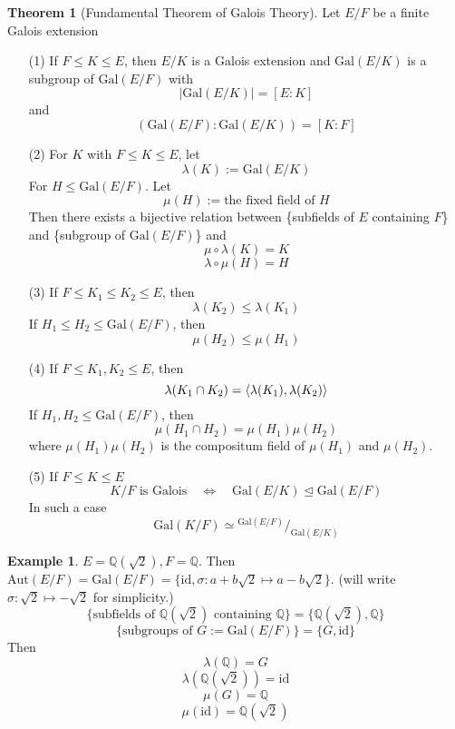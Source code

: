 \documentclass{article}
\theoremstyle{definition}
\newtheorem{thm}{Theorem}
\newtheorem{ex}{Example}
\newcommand*\quot[2]{{^{\textstyle #1}\big/_{\textstyle #2}}}
\newcommand{\QQ}{\mathbb Q}
\newcommand{\Lra}{\Leftrightarrow}
\begin{document}
\begin{thm}[Fundamental Theorem of Galois Theory]
	Let $E/F$ be a finite Galois extension
	\begin{enumerate}
		\item[(1)] If $F \leq K \leq E$, then $E/K$ is a Galois extension and $\text{Gal}(E/K)$ is a subgroup of $\text{Gal}(E/F)$ with 
			\[
				|\text{Gal}(E/K)| = [E:K]
			\]
			and
			\[
				(\text{Gal}(E/F):\text{Gal}(E/K)) = [K:F]
			\]

		\item[(2)] For $K$ with $F \leq K \leq E$, let 
			\[
				\lambda(K) := \text{Gal}(E/K)
			\]
			For $H \leq \text{Gal}(E/F)$.
			Let 
			\[
				\mu(H) := \text{the fixed field of }H
			\]
			Then there exists a bijective relation between \{subfields of $E$ containing $F$\} and \{subgroup of $\text{Gal}(E/F)$\} and
			\[
				\mu \circ \lambda(K) = K
			\]
			\[
				\lambda \circ \mu(H) = H
			\]

		\item[(3)] If $F \leq K_1 \leq K_2 \leq E$, then 
			\[
				\lambda(K_2) \leq \lambda(K_1)
			\]
			If $H_1 \leq H_2 \leq \text{Gal}(E/F)$, then
			\[
				\mu(H_2) \leq \mu(H_1)
			\]

		\item[(4)] If $F \leq K_1, K_2 \leq E$, then
			\[
				\lambda(K_1 \cap K_2) = \ev{\lambda(K_1), \lambda(K_2)}
			\]
			If $H_1, H_2 \leq \text{Gal}(E/F)$, then
			\[
				\mu(H_1 \cap H_2) = \mu(H_1) \mu(H_2)
			\]
			where $\mu(H_1) \mu(H_2)$ is the compositum field of $\mu(H_1)$ and $\mu(H_2)$.

		\item[(5)] If $F \leq K \leq E$
			\[
				K/F \text{ is Galois} \quad \Lra \quad \text{Gal}(E/K) \trianglelefteq \text{Gal}(E/F)
			\]
			In such a case
			\[
				\text{Gal}(K/F) \simeq \quot{\text{Gal}(E/F)}{\text{Gal}(E/K)}
			\]
	\end{enumerate}
\end{thm}

\begin{ex}
	$E = \QQ(\sqrt{2}), F = \QQ$.
	Then $\text{Aut}(E/F) = \text{Gal}(E/F) = \{ \text{id}, \sigma: a + b \sqrt{2} \mapsto a - b \sqrt{2}\}$.
	(will write $\sigma: \sqrt{2} \mapsto -\sqrt{2}$ for simplicity.)
	\[
		\{\text{subfields of }\QQ(\sqrt{2}) \text{ containing }\QQ\} = \{\QQ(\sqrt{2}), \QQ\}
	\]
	\[
		\{\text{subgroups of } G := \text{Gal}(E/F)\} = \{G, \text{id}\}
	\]
	Then
	\[
		\lambda(\QQ) = G
	\]
	\[
		\lambda(\QQ(\sqrt{2})) = \text{id}
	\]
	\[
		\mu(G) = \QQ
	\]
	\[
		\mu(\text{id}) = \QQ(\sqrt{2})
	\]
\end{ex}
\end{document}
